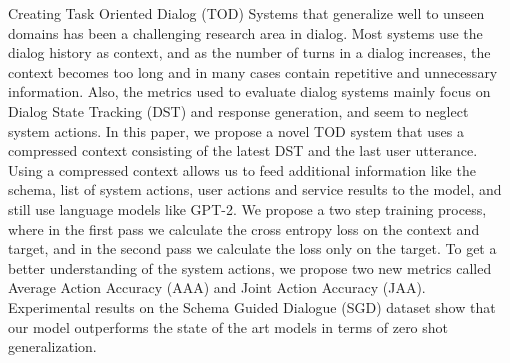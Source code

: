 Creating Task Oriented Dialog (TOD) Systems that generalize well to unseen domains has been a challenging research area in dialog.
Most systems use the dialog history as context, and as the number of turns in a dialog increases, the context becomes too long and in many cases contain
repetitive and unnecessary information. Also, the metrics used to evaluate dialog systems mainly focus on Dialog State Tracking (DST) and response generation, and seem to
neglect system actions. In this paper, we propose a novel TOD system that uses a compressed context consisting of the latest DST and the last user utterance.
Using a compressed context allows us to feed additional information like the schema, list of system actions, user actions and service results to the model, and still use
language models like GPT-2. We propose a two step training process, where in the first pass we calculate the cross entropy loss on the context and target, and
in the second pass we calculate the loss only on the target.
To get a better understanding of the system actions, we propose two new metrics called Average Action Accuracy (AAA) and Joint Action Accuracy (JAA).
Experimental results on the Schema Guided Dialogue (SGD) dataset show that our model outperforms the state of the art models in terms of zero shot generalization.
